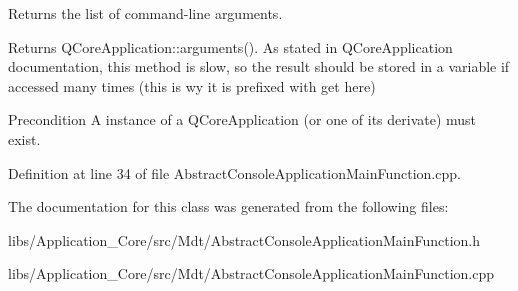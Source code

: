 Returns the list of command-\/line arguments. 

Returns Q\+Core\+Application\+::arguments(). As stated in Q\+Core\+Application documentation, this method is slow, so the result should be stored in a variable if accessed many times (this is wy it is prefixed with get here)

\begin{DoxyPrecond}{Precondition}
A instance of a Q\+Core\+Application (or one of its derivate) must exist. 
\end{DoxyPrecond}


Definition at line 34 of file Abstract\+Console\+Application\+Main\+Function.\+cpp.



The documentation for this class was generated from the following files\+:\begin{DoxyCompactItemize}
\item 
libs/\+Application\+\_\+\+Core/src/\+Mdt/Abstract\+Console\+Application\+Main\+Function.\+h\item 
libs/\+Application\+\_\+\+Core/src/\+Mdt/Abstract\+Console\+Application\+Main\+Function.\+cpp\end{DoxyCompactItemize}
